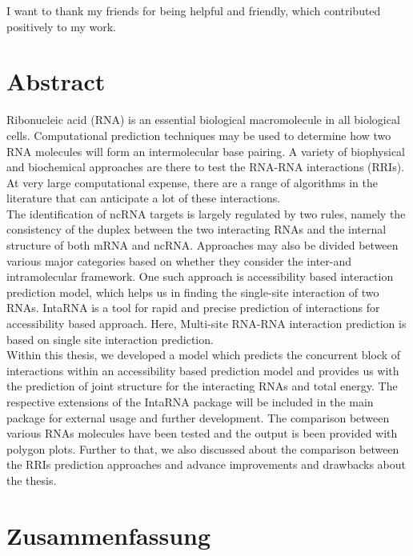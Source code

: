 \documentclass[twoside,a4paper]{report}
\begin{document}
I want to thank my friends for being helpful and friendly, which contributed positively to my work.
 \\


\newpage
\chapter*{Abstract}

Ribonucleic acid (RNA) is an essential biological macromolecule in all biological cells. Computational prediction techniques may be used to determine how two RNA molecules will form an intermolecular base pairing. A variety of biophysical and biochemical approaches are there to test the RNA-RNA interactions (RRIs). At very large computational expense, there are a range of algorithms in the literature that can anticipate a lot of these interactions.\\

 The identification of ncRNA targets is largely regulated by two rules, namely the consistency of the duplex between the two interacting RNAs and the internal structure of both mRNA and ncRNA. Approaches may also be divided between various major categories based on whether they consider the inter-and intramolecular framework. One such approach is accessibility based interaction prediction model, which helps us in finding the single-site interaction of two RNAs. IntaRNA is a tool for rapid and precise prediction of interactions for accessibility based approach. Here, Multi-site RNA-RNA interaction prediction is based on single site interaction prediction. \\

 Within this thesis, we developed a model which predicts the concurrent block of interactions within an accessibility based prediction model and provides us with the prediction of  joint structure for the interacting RNAs and total energy. The respective extensions of the IntaRNA package will be included in the main package for external usage and further development. The comparison between various RNAs molecules have been tested and the output is been provided with polygon plots. Further to that, we also discussed about the comparison between the RRIs prediction approaches and advance improvements and drawbacks about the thesis. \\



\newpage
\chapter*{Zusammenfassung}
\end{document}
